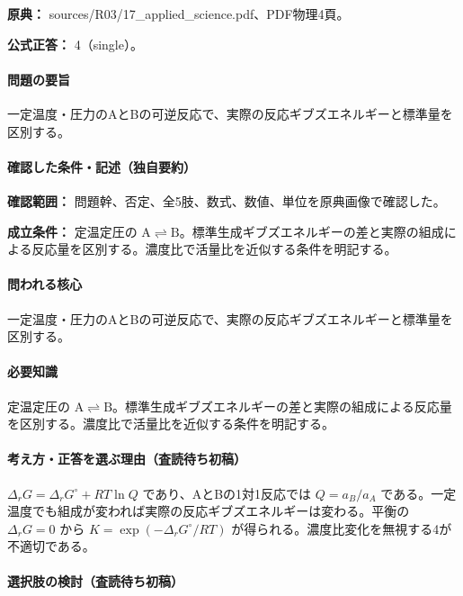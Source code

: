 \noindent\textbf{原典：} sources/R03/17\_applied\_science.pdf、PDF物理4頁。

\textbf{公式正答：} 4（single）。

\paragraph{問題の要旨} 一定温度・圧力のAとBの可逆反応で、実際の反応ギブズエネルギーと標準量を区別する。

\paragraph{確認した条件・記述（独自要約）}\mbox{}\par

\noindent\textbf{確認範囲：} 問題幹、否定、全5肢、数式、数値、単位を原典画像で確認した。\par

\noindent\textbf{成立条件：} 定温定圧の \(\mathrm{A\rightleftharpoons B}\)。標準生成ギブズエネルギーの差と実際の組成による反応量を区別する。濃度比で活量比を近似する条件を明記する。\par

\paragraph{問われる核心} 一定温度・圧力のAとBの可逆反応で、実際の反応ギブズエネルギーと標準量を区別する。

\paragraph{必要知識} 定温定圧の \(\mathrm{A\rightleftharpoons B}\)。標準生成ギブズエネルギーの差と実際の組成による反応量を区別する。濃度比で活量比を近似する条件を明記する。

\paragraph{考え方・正答を選ぶ理由（査読待ち初稿）} \(\Delta_rG=\Delta_rG^\circ+RT\ln Q\) であり、AとBの1対1反応では \(Q=a_B/a_A\) である。一定温度でも組成が変われば実際の反応ギブズエネルギーは変わる。平衡の \(\Delta_rG=0\) から \(K=\exp(-\Delta_rG^\circ/RT)\) が得られる。濃度比変化を無視する4が不適切である。

\paragraph{選択肢の検討（査読待ち初稿）}\mbox{}\par


